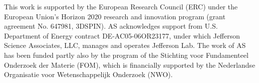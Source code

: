\documentclass[aps,preprintnumbers,showpacs,nofootinbib,superscriptaddress,floatfix]{revtex4}
\begin{document}


\begin{acknowledgments}
This work is supported by the European Research Council (ERC) under the European Union's Horizon 2020 research and innovation program (grant agreement No. 647981, 3DSPIN). 
AS acknowledges support from U.S. Department of Energy contract DE-AC05-06OR23177, under which Jefferson Science Associates, LLC, manages and operates Jefferson Lab. 
The work of AS has been funded partly also by the program of the Stichting voor Fundamenteel Onderzoek der Materie (FOM), which is financially supported by the Nederlandse Organisatie voor Wetenschappelijk Onderzoek (NWO).
\end{acknowledgments}



%
%


%
%
\end{document}
